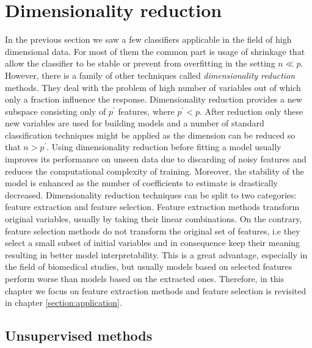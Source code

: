 \documentclass[shortabstract, english, mgr]{iithesis}
\begin{document}
\section{Dimensionality reduction}

In the previous section we saw a few classifiers applicable in the field of high dimensional data. For most of them the common part is usage of shrinkage that allow the classifier to be stable or prevent from overfitting in the setting $n \ll p$. However, there is a family of other techniques called \textit{dimensionality reduction} methods. They deal with the problem of high number of variables out of which only a fraction influence the response. Dimensionality reduction provides a new subspace consisting only of $p^{\prime}$ features, where $p^{\prime} < p$. After reduction only these new variables are used for building models and a number of standard classification techniques might be applied as the dimension can be reduced so that $n > p^{\prime}$. Using dimensionality reduction before fitting a model usually improves its performance on unseen data due to discarding of noisy features and reduces the computational complexity of training. Moreover, the stability of the model is enhanced as the number of coefficients to estimate is drastically decreased. Dimensionality reduction techniques can be split to two categories: feature extraction and feature selection. Feature extraction methods transform original variables, usually by taking their linear combinations. On the contrary, feature selection methods do not transform the original set of features, i.e they select a small subset of initial variables and in consequence keep their meaning resulting in better model interpretability. This is a great advantage, especially in the field of biomedical studies, but usually models based on selected features perform worse than models based on the extracted ones. Therefore, in this chapter we focus on feature extraction methods and feature selection is revisited in chapter \ref{section:application}.

\subsection{Unsupervised methods}
\end{document}
